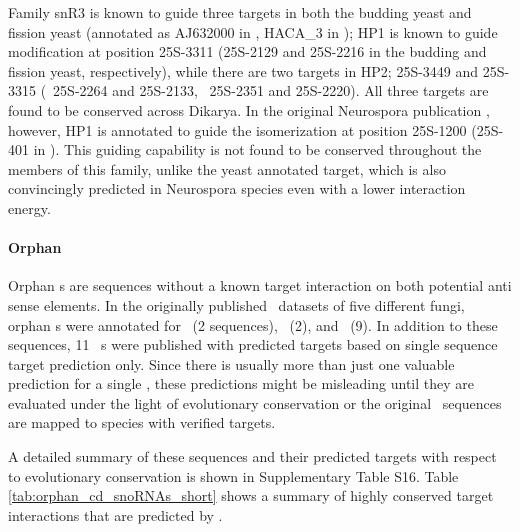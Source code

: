Family snR3 is known \cite{Schattner:2004} to guide three targets in
both the budding yeast and fission yeast (annotated as AJ632000 in
\spo, HACA\_3 in \snostrip); HP1 is known to guide modification at
position 25S-3311 (25S-2129 and 25S-2216 in the budding and fission
yeast, respectively), while there are two targets in HP2; 25S-3449 and
25S-3315 (\sce\ 25S-2264 and 25S-2133, \spo\ 25S-2351 and
25S-2220). All three targets are found to be conserved across
Dikarya. In the original Neurospora publication \cite{Liu:2009},
however, HP1 is annotated to guide the isomerization at position
25S-1200 (25S-401 in \Ncr). This guiding capability is not found to be
conserved throughout the members of this family, unlike the yeast
annotated target, which is also convincingly predicted in Neurospora
species even with a lower interaction energy.

\paragraph{\textbf{Orphan \sno}}
Orphan \sno s are sequences without a known target interaction on both
potential anti sense elements. In the originally published \sno\
datasets of five different fungi, orphan \cd s were annotated for
\sce\ (2 sequences), \ncr\ (2), and \afu\ (9). In addition to these
sequences, 11 \ncr\ \sno s were published with predicted targets
based on single sequence target prediction only. Since there is
usually more than just one valuable prediction for a single \sno,
these predictions might be misleading until they are evaluated under
the light of evolutionary conservation or the original \sno\ sequences
are mapped to species with verified targets.

A detailed summary of these sequences and their predicted targets with
respect to evolutionary conservation is shown in Supplementary Table
S16. Table \ref{tab:orphan_cd_snoRNAs_short} shows a summary of highly
conserved target interactions that are predicted by \snostrip.

